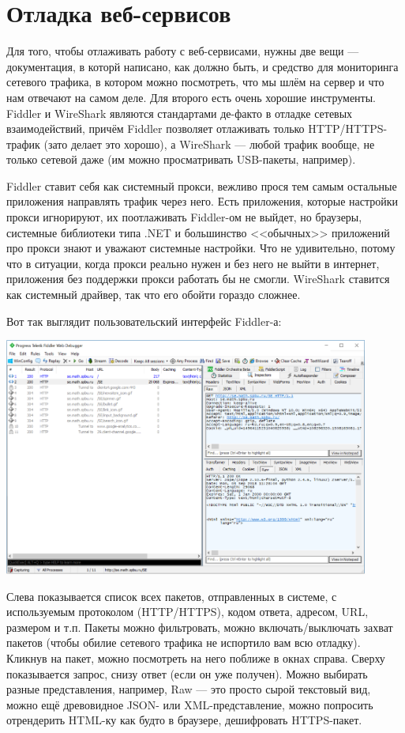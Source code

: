 \documentclass[a5paper]{article}
\begin{document}
\section{Отладка веб-сервисов}

Для того, чтобы отлаживать работу с веб-сервисами, нужны две вещи --- документация, в которй написано, как должно быть, и средство для мониторинга сетевого трафика, в котором можно посмотреть, что мы шлём на сервер и что нам отвечают на самом деле. Для второго есть очень хорошие инструменты. Fiddler и WireShark являются стандартами де-факто в отладке сетевых взаимодействий, причём Fiddler позволяет отлаживать только HTTP/HTTPS-трафик (зато делает это хорошо), а WireShark --- любой трафик вообще, не только сетевой даже (им можно просматривать USB-пакеты, например). 

Fiddler ставит себя как системный прокси, вежливо прося тем самым остальные приложения направлять трафик через него. Есть приложения, которые настройки прокси игнорируют, их поотлаживать Fiddler-ом не выйдет, но браузеры, системные библиотеки типа .NET и большинство <<обычных>> приложений про прокси знают и уважают системные настройки. Что не удивительно, потому что в ситуации, когда прокси реально нужен и без него не выйти в интернет, приложения без поддержки прокси работать бы не смогли. WireShark ставится как системный драйвер, так что его обойти гораздо сложнее.

Вот так выглядит пользовательский интерфейс Fiddler-а:

\begin{center}
    \includegraphics[width=0.9\textwidth]{fiddler.png}
\end{center}

Слева показывается список всех пакетов, отправленных в системе, с используемым протоколом (HTTP/HTTPS), кодом ответа, адресом, URL, размером и т.п. Пакеты можно фильтровать, можно включать/выключать захват пакетов (чтобы обилие сетевого трафика не испортило вам всю отладку). Кликнув на пакет, можно посмотреть на него поближе в окнах справа. Сверху показывается запрос, снизу ответ (если он уже получен). Можно выбирать разные представления, например, Raw --- это просто сырой текстовый вид, можно ещё древовидное JSON- или XML-представление, можно попросить отрендерить HTML-ку как будто в браузере, дешифровать HTTPS-пакет. 
\end{document}
